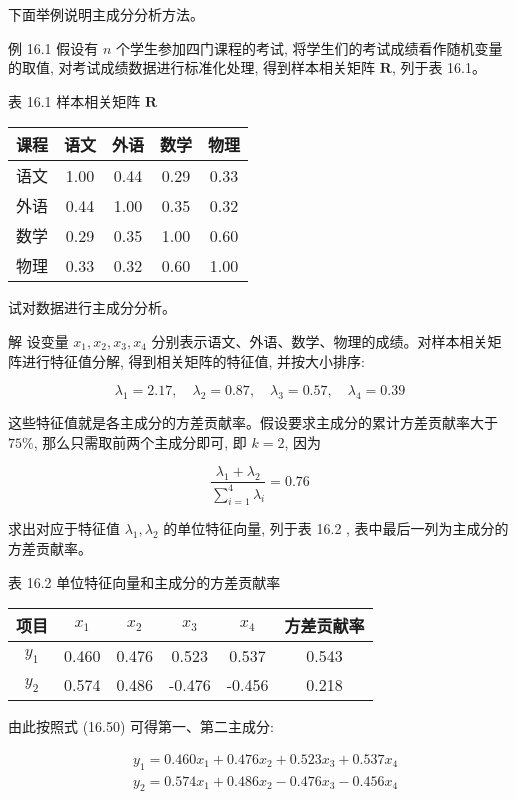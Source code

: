 \documentclass[10pt]{article}
\begin{document}
下面举例说明主成分分析方法。

例 16.1 假设有 $n$ 个学生参加四门课程的考试, 将学生们的考试成绩看作随机变量的取值, 对考试成绩数据进行标准化处理, 得到样本相关矩阵 $\boldsymbol{R}$, 列于表 16.1。

表 16.1 样本相关矩阵 $\boldsymbol{R}$

\begin{center}
\begin{tabular}{ccccc}
\hline
课程 & 语文 & 外语 & 数学 & 物理 \\
\hline
语文 & 1.00 & 0.44 & 0.29 & 0.33 \\
外语 & 0.44 & 1.00 & 0.35 & 0.32 \\
数学 & 0.29 & 0.35 & 1.00 & 0.60 \\
物理 & 0.33 & 0.32 & 0.60 & 1.00 \\
\hline
\end{tabular}
\end{center}

试对数据进行主成分分析。

解 设变量 $x_{1}, x_{2}, x_{3}, x_{4}$ 分别表示语文、外语、数学、物理的成绩。对样本相关矩阵进行特征值分解, 得到相关矩阵的特征值, 并按大小排序:

$$
\lambda_{1}=2.17, \quad \lambda_{2}=0.87, \quad \lambda_{3}=0.57, \quad \lambda_{4}=0.39
$$

这些特征值就是各主成分的方差贡献率。假设要求主成分的累计方差贡献率大于 $75 \%$, 那么只需取前两个主成分即可, 即 $k=2$, 因为

$$
\frac{\lambda_{1}+\lambda_{2}}{\sum_{i=1}^{4} \lambda_{i}}=0.76
$$

求出对应于特征值 $\lambda_{1}, \lambda_{2}$ 的单位特征向量, 列于表 16.2 , 表中最后一列为主成分的方差贡献率。

表 16.2 单位特征向量和主成分的方差贡献率

\begin{center}
\begin{tabular}{cccccc}
\hline
项目 & $x_{1}$ & $x_{2}$ & $x_{3}$ & $x_{4}$ & 方差贡献率 \\
\hline
$y_{1}$ & 0.460 & 0.476 & 0.523 & 0.537 & 0.543 \\
$y_{2}$ & 0.574 & 0.486 & -0.476 & -0.456 & 0.218 \\
\hline
\end{tabular}
\end{center}

由此按照式 (16.50) 可得第一、第二主成分:

$$
\begin{aligned}
& y_{1}=0.460 x_{1}+0.476 x_{2}+0.523 x_{3}+0.537 x_{4} \\
& y_{2}=0.574 x_{1}+0.486 x_{2}-0.476 x_{3}-0.456 x_{4}
\end{aligned}
$$
\end{document}
